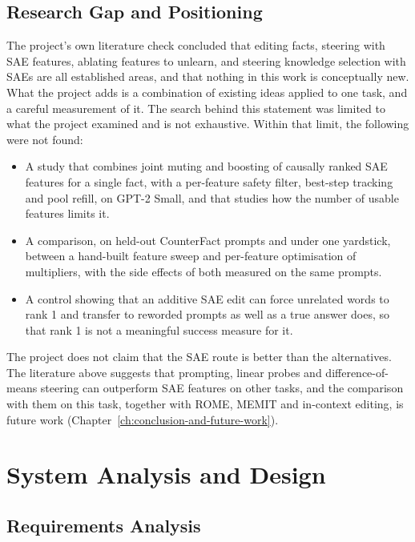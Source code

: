 \documentclass[12pt,a4paper]{report}
\begin{document}
\section{Research Gap and Positioning}

The project's own literature check concluded that editing facts, steering with SAE features, ablating features to unlearn, and steering knowledge selection with SAEs are all established areas, and that nothing in this work is conceptually new. What the project adds is a combination of existing ideas applied to one task, and a careful measurement of it. The search behind this statement was limited to what the project examined and is not exhaustive. Within that limit, the following were not found:

\begin{itemize}
  \item A study that combines joint muting and boosting of causally ranked SAE features for a single fact, with a per-feature safety filter, best-step tracking and pool refill, on GPT-2 Small, and that studies how the number of usable features limits it.
  \item A comparison, on held-out CounterFact prompts and under one yardstick, between a hand-built feature sweep and per-feature optimisation of multipliers, with the side effects of both measured on the same prompts.
  \item A control showing that an additive SAE edit can force unrelated words to rank 1 and transfer to reworded prompts as well as a true answer does, so that rank 1 is not a meaningful success measure for it.
\end{itemize}

The project does not claim that the SAE route is better than the alternatives. The literature above suggests that prompting, linear probes and difference-of-means steering can outperform SAE features on other tasks, and the comparison with them on this task, together with ROME, MEMIT and in-context editing, is future work (Chapter~\ref{ch:conclusion-and-future-work}).

\chapter{System Analysis and Design}\label{ch:system-analysis-and-design}

\section{Requirements Analysis}
\end{document}
